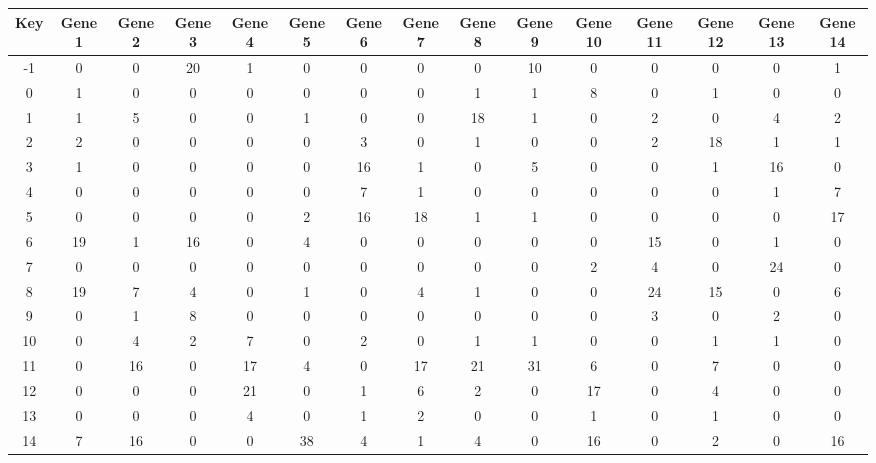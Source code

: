\begin{tabular}{|c|c|c|c|c|c|c|c|c|c|c|c|c|c|c|}
\hline
Key & Gene 1 & Gene 2 & Gene 3 & Gene 4 & Gene 5 & Gene 6 & Gene 7 & Gene 8 & Gene 9 & Gene 10 & Gene 11 & Gene 12 & Gene 13 & Gene 14 \\
\hline
-1 & 0 & 0 & 20 & 1 & 0 & 0 & 0 & 0 & 10 & 0 & 0 & 0 & 0 & 1 \\
0 & 1 & 0 & 0 & 0 & 0 & 0 & 0 & 1 & 1 & 8 & 0 & 1 & 0 & 0 \\
1 & 1 & 5 & 0 & 0 & 1 & 0 & 0 & 18 & 1 & 0 & 2 & 0 & 4 & 2 \\
2 & 2 & 0 & 0 & 0 & 0 & 3 & 0 & 1 & 0 & 0 & 2 & 18 & 1 & 1 \\
3 & 1 & 0 & 0 & 0 & 0 & 16 & 1 & 0 & 5 & 0 & 0 & 1 & 16 & 0 \\
4 & 0 & 0 & 0 & 0 & 0 & 7 & 1 & 0 & 0 & 0 & 0 & 0 & 1 & 7 \\
5 & 0 & 0 & 0 & 0 & 2 & 16 & 18 & 1 & 1 & 0 & 0 & 0 & 0 & 17 \\
6 & 19 & 1 & 16 & 0 & 4 & 0 & 0 & 0 & 0 & 0 & 15 & 0 & 1 & 0 \\
7 & 0 & 0 & 0 & 0 & 0 & 0 & 0 & 0 & 0 & 2 & 4 & 0 & 24 & 0 \\
8 & 19 & 7 & 4 & 0 & 1 & 0 & 4 & 1 & 0 & 0 & 24 & 15 & 0 & 6 \\
9 & 0 & 1 & 8 & 0 & 0 & 0 & 0 & 0 & 0 & 0 & 3 & 0 & 2 & 0 \\
10 & 0 & 4 & 2 & 7 & 0 & 2 & 0 & 1 & 1 & 0 & 0 & 1 & 1 & 0 \\
11 & 0 & 16 & 0 & 17 & 4 & 0 & 17 & 21 & 31 & 6 & 0 & 7 & 0 & 0 \\
12 & 0 & 0 & 0 & 21 & 0 & 1 & 6 & 2 & 0 & 17 & 0 & 4 & 0 & 0 \\
13 & 0 & 0 & 0 & 4 & 0 & 1 & 2 & 0 & 0 & 1 & 0 & 1 & 0 & 0 \\
14 & 7 & 16 & 0 & 0 & 38 & 4 & 1 & 4 & 0 & 16 & 0 & 2 & 0 & 16 \\
\hline
\end{tabular}
